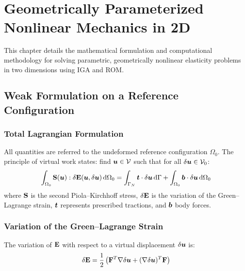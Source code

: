 \chapter{Geometrically Parameterized Nonlinear Mechanics in 2D}
\label{ch:nl-mechanics-2d}

This chapter details the mathematical formulation and computational methodology for solving parametric, geometrically nonlinear elasticity problems in two dimensions using IGA and ROM.

\section{Weak Formulation on a Reference Configuration}
\label{sec:weak-form}

\subsection{Total Lagrangian Formulation}

All quantities are referred to the undeformed reference configuration $\Omega_0$. The principle of virtual work states: find $\bm{u} \in \mathcal{V}$ such that for all $\delta\bm{u} \in \mathcal{V}_0$:
\begin{equation}
    \int_{\Omega_0} \mathbf{S}(\bm{u}) : \delta\mathbf{E}(\bm{u}, \delta\bm{u}) \, \mathrm{d}\Omega_0 = \int_{\Gamma_N} \bm{t} \cdot \delta\bm{u} \, \mathrm{d}\Gamma + \int_{\Omega_0} \bm{b} \cdot \delta\bm{u} \, \mathrm{d}\Omega_0
    \label{eq:weak-form}
\end{equation}
where $\mathbf{S}$ is the second Piola--Kirchhoff stress, $\delta\mathbf{E}$ is the variation of the Green--Lagrange strain, $\bm{t}$ represents prescribed tractions, and $\bm{b}$ body forces.

\subsection{Variation of the Green--Lagrange Strain}

The variation of $\mathbf{E}$ with respect to a virtual displacement $\delta\bm{u}$ is:
\begin{equation}
    \delta\mathbf{E} = \frac{1}{2}\left(\mathbf{F}^T \nabla\delta\bm{u} + (\nabla\delta\bm{u})^T \mathbf{F}\right)
\end{equation}

